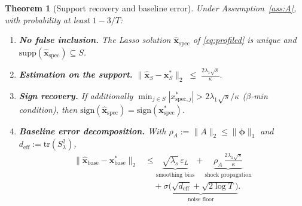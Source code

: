 \documentclass[10pt]{article} %
\theoremstyle{plain}
\newtheorem{theorem}{Theorem}
\theoremstyle{definition}
\begin{document}
\begin{theorem}[Support recovery and baseline error]
\label{thm:identifiability}
Under Assumption~\ref{ass:A}, with probability at least $1 - 3/T$:
\begin{enumerate}
\item[(a)] \textbf{No false inclusion.} The Lasso solution
$\hat{\mathbf{x}}_{\mathrm{spec}}$ of \eqref{eq:profiled} is unique
and $\mathrm{supp}(\hat{\mathbf{x}}_{\mathrm{spec}}) \subseteq S$.
\item[(b)] \textbf{Estimation on the support.}
$\displaystyle
\|\hat{\mathbf{x}}_{S} - \mathbf{x}^{*}_{S}\|_{2}
\;\le\; \frac{2\lambda_{1}\sqrt{s}}{\kappa}.$
\item[(c)] \textbf{Sign recovery.} If additionally
$\min_{j\in S}|x^{*}_{\mathrm{spec},j}| > 2\lambda_{1}\sqrt{s}/\kappa$
($\beta$-min condition), then
$\mathrm{sign}(\hat{\mathbf{x}}_{\mathrm{spec}})
= \mathrm{sign}(\mathbf{x}^{*}_{\mathrm{spec}})$.
\item[(d)] \textbf{Baseline error decomposition.} With
$\rho_{A} := \|A\|_{2} \le \|\boldsymbol{\phi}\|_{1}$ and
$d_{\mathrm{eff}} := \mathrm{tr}(S_{\lambda}^{2})$,
\begin{equation}
\begin{split}
\|\hat{\mathbf{x}}_{\mathrm{base}} - \mathbf{x}^{*}_{\mathrm{base}}\|_{2}
&\le
\underbrace{\sqrt{\lambda_{s}}\,\varepsilon_{L}}_{\text{smoothing bias}}
+
\underbrace{\rho_{A}\,\frac{2\lambda_{1}\sqrt{s}}{\kappa}}_{\text{shock propagation}} \\
&\quad +
\underbrace{\sigma\bigl(\sqrt{d_{\mathrm{eff}}}
+ \sqrt{2\log T}\bigr)}_{\text{noise floor}} .
\end{split}
\label{eq:baseline-bound}
\end{equation}
\end{enumerate}
\end{theorem}
\end{document}
